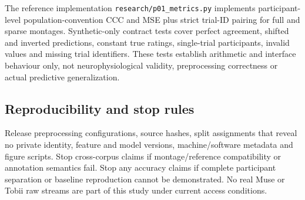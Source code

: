 The reference implementation \texttt{research/p01\_metrics.py} implements
participant-level population-convention CCC and MSE plus strict trial-ID
pairing for full and sparse montages. Synthetic-only contract tests cover
perfect agreement, shifted and inverted predictions, constant true ratings,
single-trial participants, invalid values and missing trial identifiers.
These tests establish arithmetic and interface behaviour only, not
neurophysiological validity, preprocessing correctness or actual predictive
generalization.

\subsection{Reproducibility and stop rules}
Release preprocessing configurations, source hashes, split assignments that reveal no private identity, feature and model versions, machine/software metadata and figure scripts. Stop cross-corpus claims if montage/reference compatibility or annotation semantics fail. Stop any accuracy claims if complete participant separation or baseline reproduction cannot be demonstrated. No real Muse or Tobii raw streams are part of this study under current access conditions.
